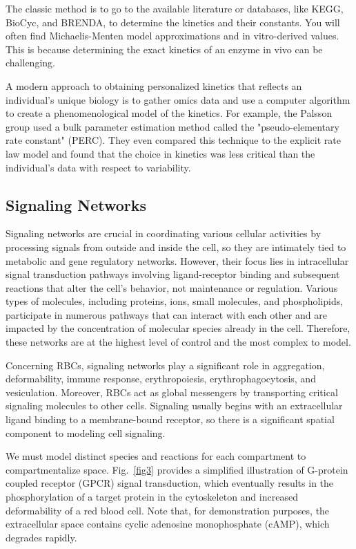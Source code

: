 \documentclass[conference]{IEEEtran}
\begin{document}
The classic method is to go to the available literature or databases, like KEGG, BioCyc, and BRENDA, to determine the kinetics and their constants. You will often find Michaelis-Menten model approximations and in vitro-derived values. This is because determining the exact kinetics of an enzyme in vivo can be challenging\cite{c1}.

A modern approach to obtaining personalized kinetics that reflects an individual's unique biology is to gather omics data and use a computer algorithm to create a phenomenological model of the kinetics. For example, the Palsson group used a bulk parameter estimation method called the "pseudo-elementary rate constant" (PERC)\cite{b31}. They even compared this technique to the explicit rate law model and found that the choice in kinetics was less critical than the individual's data with respect to variability.

\subsection{Signaling Networks}

Signaling networks are crucial in coordinating various cellular activities by processing signals from outside and inside the cell, so they are intimately tied to metabolic and gene regulatory networks\cite{b33}. However, their focus lies in intracellular signal transduction pathways involving ligand-receptor binding and subsequent reactions that alter the cell's behavior, not maintenance or regulation. Various types of molecules, including proteins, ions, small molecules, and phospholipids, participate in numerous pathways that can interact with each other and are impacted by the concentration of molecular species already in the cell. Therefore, these networks are at the highest level of control and the most complex to model.

Concerning RBCs, signaling networks play a significant role in aggregation, deformability, immune response, erythropoiesis, erythrophagocytosis, and vesiculation\cite{b39, b40, b41, b42, b43, b44, b45, b46, b47}. Moreover,  RBCs act as global messengers by transporting critical signaling molecules to other cells\cite{b48}. Signaling usually begins with an extracellular ligand binding to a membrane-bound receptor, so there is a significant spatial component to modeling cell signaling.

We must model distinct species and reactions for each compartment to compartmentalize space. Fig.~\ref{fig3} provides a simplified illustration of G-protein coupled receptor (GPCR) signal transduction, which eventually results in the phosphorylation of a target protein in the cytoskeleton and increased deformability of a red blood cell. Note that, for demonstration purposes, the extracellular space contains cyclic adenosine monophosphate (cAMP), which degrades rapidly.
\end{document}
